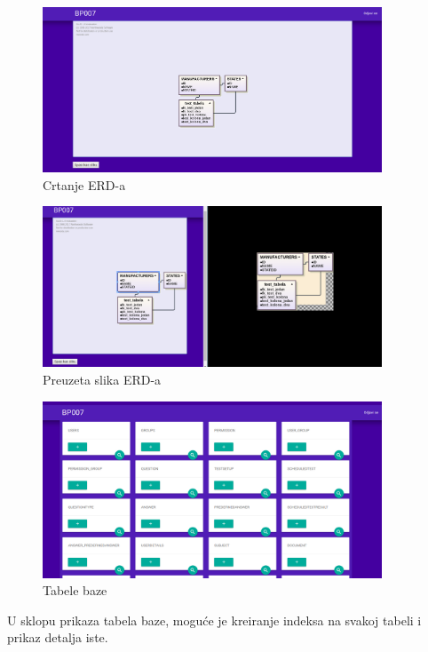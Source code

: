 \documentclass[12pt, a4paper]{report}
\theoremstyle{definition}
\begin{document}
\begin{figure}[H]
	\begin{center} 
		\includegraphics[width=0.9\textwidth]{a20.png}
	\end{center}
	\caption{Crtanje ERD-a}
\end{figure}
\begin{figure}[H]
	\begin{center} 
		\includegraphics[width=0.9\textwidth]{a21.png}
	\end{center}
	\caption{Preuzeta slika ERD-a}
\end{figure}



\begin{figure}[H]
	\begin{center} 
		\includegraphics[width=0.9\textwidth]{a7.png}
	\end{center}
	\caption{Tabele baze}
\end{figure}
\newpage
U sklopu prikaza tabela baze, moguće je kreiranje indeksa na svakoj tabeli i prikaz detalja iste.
\end{document}
